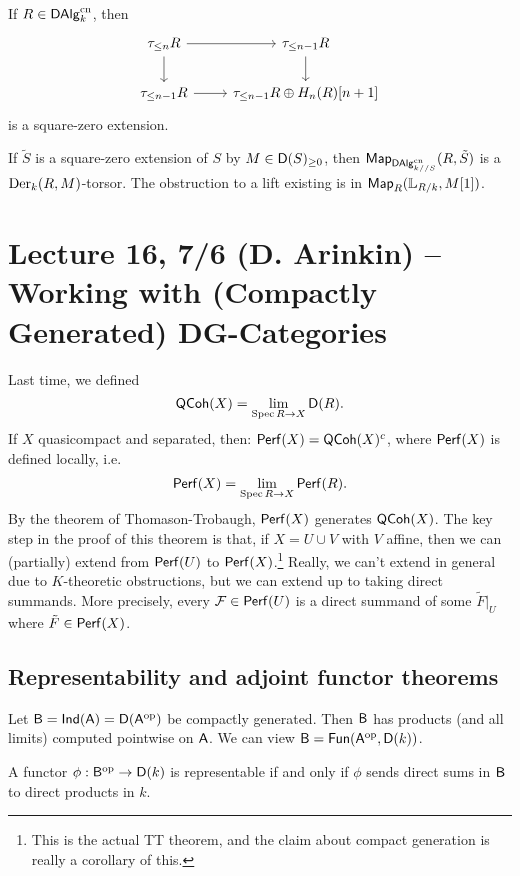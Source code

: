 \documentclass{amsart}
\begin{document}
\begin{ex}
	If $R \in \mathsf{DAlg}_k^{\mathrm{cn}}$, then
	\[
		\begin{tikzcd}
			\tau_{\leq n} R \rar \dar & \tau_{\leq n - 1} R \dar \\
			\tau_{\leq n - 1} R \rar & \tau_{\leq n - 1} R \oplus H_n(R)[n+1]
		\end{tikzcd}
	\]
	is a square-zero extension.
\end{ex}

\begin{prop}
	If $\tilde{S}$ is a square-zero extension of $S$ by $M \in \mathsf{D}(S)_{\geq 0}$, then $\mathsf{Map}_{\mathsf{DAlg}_{k//S}^{\mathrm{cn}}}(R, \tilde{S})$ is a $\operatorname{Der}_k(R, M)$-torsor.
	The obstruction to a lift existing is in $\mathsf{Map}_R(\mathbb{L}_{R/k}, M[1])$.
\end{prop}

\section{Lecture 16, 7/6 (D. Arinkin) -- Working with (Compactly Generated) DG-Categories}

Last time, we defined
\[
	\mathsf{QCoh}(X) = \lim_{\operatorname{Spec} R \to X} \mathsf{D}(R).
\]
If $X$ quasicompact and separated, then:
$\mathsf{Perf}(X) = \mathsf{QCoh}(X)^c$, where $\mathsf{Perf}(X)$ is defined locally, i.e.\
\[
\mathsf{Perf}(X) = \lim_{\operatorname{Spec} R \to X} \mathsf{Perf}(R).
\]
By the theorem of Thomason-Trobaugh, $\mathsf{Perf}(X)$ generates $\mathsf{QCoh}(X)$.
The key step in the proof of this theorem is that, if $X = U \cup V$ with $V$ affine, then we can (partially) extend from $\mathsf{Perf}(U)$ to $\mathsf{Perf}(X)$.\footnote{This is the actual TT theorem, and the claim about compact generation is really a corollary of this.}
Really, we can't extend in general due to $K$-theoretic obstructions, but we can extend up to taking direct summands.
More precisely, every $\mathcal{F} \in \mathsf{Perf}(U)$ is a direct summand of some $\tilde{F}|_U$ where $\tilde{F} \in \mathsf{Perf}(X)$.

\subsection{Representability and adjoint functor theorems}

Let $\mathsf{B} = \mathsf{Ind}(\mathsf{A}) = \mathsf{D}(\mathsf{A}^{\mathrm{op}})$ be compactly generated.
Then $\mathsf{B}$ has products (and all limits) computed pointwise on $\mathsf{A}$.
We can view $\mathsf{B} = \mathsf{Fun}(\mathsf{A}^{\mathrm{op}}, \mathsf{D}(k))$.

\begin{prop}
	A functor $\phi: \mathsf{B}^{\mathrm{op}} \to \mathsf{D}(k)$ is representable if and only if $\phi$ sends direct sums in $\mathsf{B}$ to direct products in $k$.
\end{prop}
\end{document}
